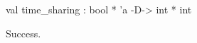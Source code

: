 \runverbatimtrue
{}
\begin{RunVerbatimMsg}
val time_sharing : bool * 'a -D-> int * int
\end{RunVerbatimMsg}
\begin{RunVerbatimErr}
Success.
\end{RunVerbatimErr}
